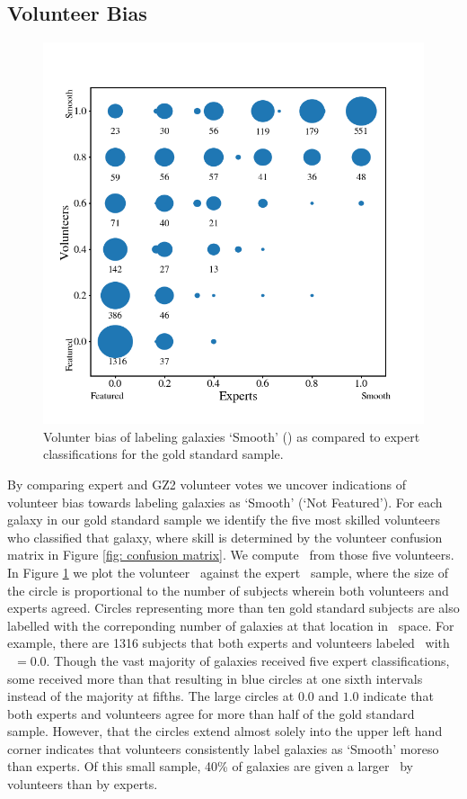 \subsection{Volunteer Bias}

\begin{figure}
\centering
\includegraphics[width=5in]{Figures/expert_vs_volunteer_votes_highskill_11-6-17.png}
\caption[]{Volunter bias of labeling galaxies `Smooth' (\notfeat) as compared to expert classifications for the gold standard sample.}
\label{fig: volunteer bias}
\end{figure}

By comparing expert and GZ2 volunteer votes we uncover indications of volunteer bias towards labeling galaxies as `Smooth' (`Not Featured'). For each galaxy in our gold standard sample we identify the five most skilled volunteers who classified that galaxy, where skill is determined by the volunteer confusion matrix in Figure \ref{fig: confusion matrix}. We compute \fsmooth~from those five volunteers. In Figure \ref{fig: volunteer bias} we plot the volunteer \fsmooth~against the expert \fsmooth~sample, where the size of the circle is proportional to the number of subjects wherein both volunteers and experts agreed. Circles representing more than ten gold standard subjects are also labelled with the correponding number of galaxies at that location in \fsmooth~space. For example, there are 1316 subjects that both experts and volunteers labeled \feat~with \fsmooth~$ = 0.0$. Though the vast majority of galaxies received five expert classifications, some received more than that resulting in blue circles at one sixth intervals instead of the majority at fifths. The large circles at $0.0$ and $1.0$ indicate that both experts and volunteers agree for more than half of the gold standard sample. However, that the circles extend almost solely into the upper left hand corner indicates that volunteers consistently label galaxies as `Smooth' moreso than experts. Of this small sample, 40\% of galaxies are given a larger \fsmooth~by volunteers than by experts. 

